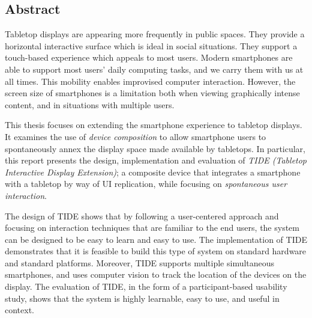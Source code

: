 \documentclass[a4paper,11pt,twoside,onecolumn,openright,final]{memoir}
\begin{document}



\subsection*{Abstract}

Tabletop displays are appearing more frequently in public spaces.
They provide a horizontal interactive surface which is ideal in social situations. They support a touch-based experience which appeals to most users.
Modern smartphones are able to support most users' daily computing tasks, and we carry them with us at all times.
This mobility enables improvised computer interaction.
However, the screen size of smartphones is a limitation both when viewing graphically intense content, and in situations with multiple users.

This thesis focuses on extending the smartphone experience to tabletop displays.
It examines the use of \emph{device composition} to allow smartphone users to spontaneously annex the display space made available by tabletops.
In particular, this report presents the design, implementation and evaluation of \emph{TIDE (Tabletop Interactive Display Extension)}; a composite device that integrates a smartphone with a tabletop by way of UI replication, while focusing on \emph{spontaneous user interaction}.

The design of TIDE shows that by following a user-centered approach and focusing on interaction techniques that are familiar to the end users, the system can be designed to be easy to learn and easy to use.
The implementation of TIDE demonstrates that it is feasible to build this type of system on standard hardware and standard platforms.
Moreover, TIDE supports multiple simultaneous smartphones, and uses computer vision to track the location of the devices on the display.
The evaluation of TIDE, in the form of a participant-based usability study, shows that the system is highly learnable, easy to use, and useful in context.

\clearpage

\newpage
\mbox{}
\clearpage

\hfill\\
\hfill\\
\hfill\\
\hfill\\
\hfill\\
\hfill\\
\hfill\\
\hfill\\
\hfill\\
\hfill\\
\end{document}
